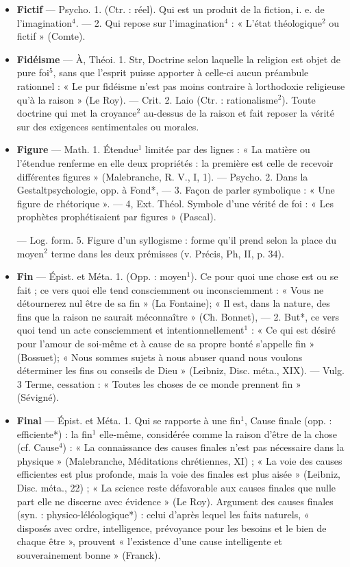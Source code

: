 \begin{itemize}[leftmargin=1cm, label=, itemsep=1pt]
\item {\bf Fictif} — Psycho. 1. (Ctr. : réel). Qui
est un produit de la fiction, i. e. de
l’imagination$^4$. — 2. Qui repose sur
l'imagination$^4$ : « L'état théologique$^2$ ou fictif » (Comte).

\item {\bf Fidéisme} — À, Théoi. 1. Str, Doctrine
selon laquelle la religion est objet
de pure foi$^5$, sans que l'esprit puisse
apporter à celle-ci aucun préambule rationnel : « Le pur fidéisme
n’est pas moins contraire à lorthodoxie religieuse qu'à la raison » (Le
Roy). — Crit. 2. Laio (Ctr. : rationalisme$^2$). Toute doctrine qui met
la croyance$^2$ au-dessus de la raison
et fait reposer la vérité sur des exigences sentimentales ou morales.

\item {\bf Figure} — Math. 1. Étendue$^1$ limitée
par des lignes : « La matière ou
l'étendue renferme en elle deux
propriétés : la première est celle de
recevoir différentes figures » (Malebranche, R. V., I, 1). — Psycho.
2. Dans la Gestaltpsychologie, opp. à
Fond*, — 3. Façon de parler symbolique : « Une figure de rhétorique ». — 4, Ext. Théol. Symbole
d’une vérité de foi : « Les prophètes
prophétisaient par figures » (Pascal).

— Log. form. 5. Figure d’un syllogisme : forme qu'il prend selon
la place du moyen$^2$ terme dans
les deux prémisses (v. Précis, Ph, II,
p. 34).

\item {\bf Fin} — Épist. et Méta. 1. (Opp. :
moyen$^1$). Ce pour quoi une chose
est ou se fait ; ce vers quoi elle tend
consciemment ou inconsciemment :
« Vous ne détournerez nul être de
sa fin » (La Fontaine); « Il est, dans
la nature, des fins que la raison ne
saurait méconnaître » (Ch. Bonnet),
— 2. But*, ce vers quoi tend un
acte consciemment et intentionnellement$^1$ : « Ce qui est désiré pour
l'amour de soi-même et à cause de
sa propre bonté s’appelle fin » (Bossuet); « Nous sommes sujets à nous
abuser quand nous voulons déterminer les fins ou conseils de Dieu »
(Leibniz, Disc. méta., XIX).
— Vulg. 3 Terme, cessation :
« Toutes les choses de ce monde
prennent fin » (Sévigné).

\item {\bf Final} — Épist. et Méta. 1. Qui se
rapporte à une fin$^1$, Cause finale
(opp. : efficiente*) : la fin$^1$ elle-même,
considérée comme la raison d’être
de la chose (cf. Cause$^4$) : « La connaissance des causes finales n’est
pas nécessaire dans la physique »
(Malebranche, Méditations chrétiennes, XI) ; « La voie des causes
efficientes est plus profonde, mais
la voie des finales est plus aisée »
(Leibniz, Disc. méta., 22) ; « La
science reste défavorable aux causes
finales que nulle part elle ne discerne
avec évidence » (Le Roy). Argument des causes finales (syn. : physico-léléologique*) : celui d’après
lequel les faits naturels, « disposés
avec ordre, intelligence, prévoyance
pour les besoins et le bien de chaque
être », prouvent « l'existence d’une
cause intelligente et souverainement bonne » (Franck).


\end{itemize}
